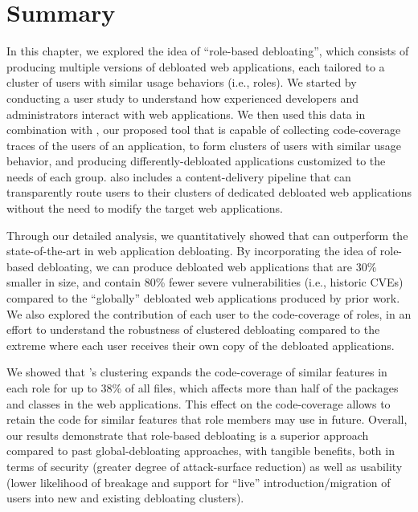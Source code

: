 \section{Summary}

In this chapter, we explored the idea of ``role-based debloating'', which consists of producing multiple versions of debloated web applications, each tailored to a cluster of users with similar usage behaviors (i.e., roles). 
We started by conducting a user study to understand how experienced developers and administrators interact with web applications. 
We then used this data in combination with \dbltr{}, our proposed tool that is capable of collecting code-coverage traces of the users of an application, to form clusters of users with similar usage behavior, and producing differently-debloated applications customized to the needs of each group. 
\dbltr{} also includes a content-delivery pipeline that can transparently route users to their clusters of dedicated debloated web applications without the need to modify the target web applications. 

Through our detailed analysis, we quantitatively showed that \dbltr{} can outperform the state-of-the-art in web application debloating. 
By incorporating the idea of role-based debloating, we can produce debloated web applications that are 30\% smaller in size, and contain 80\% fewer severe vulnerabilities (i.e., historic CVEs) compared to the ``globally'' debloated web applications produced by prior work. We also explored the contribution of each user to the code-coverage of roles, in an effort to understand the robustness of clustered debloating compared to the extreme where each user receives their own copy of the debloated applications. 

We showed that \dbltr{}'s clustering expands the code-coverage of similar features in each role for up to 38\% of all files, which affects more than half of the packages and classes in the web applications. This effect on the code-coverage allows \dbltr{} to retain the code for similar features that role members may use in future. 
Overall, our results demonstrate that role-based debloating is a superior approach compared to past global-debloating approaches, with tangible benefits, both in terms of security (greater degree of attack-surface reduction) as well as usability (lower likelihood of breakage and support for ``live'' introduction/migration of users into new and existing debloating clusters).
